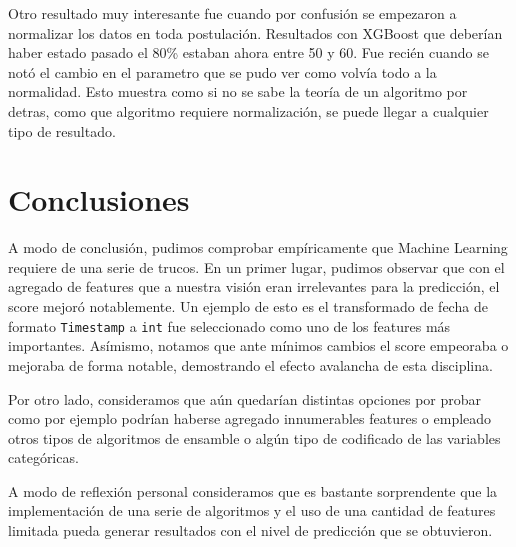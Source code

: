 \documentclass[a4paper]{article}
\begin{document}
Otro resultado muy interesante fue cuando por confusión se empezaron a normalizar los datos en toda postulación. Resultados con XGBoost que deberían haber estado pasado el 80\% estaban ahora entre 50 y 60. Fue recién cuando se notó el cambio en el parametro que se pudo ver como volvía todo a la normalidad. Esto muestra como si no se sabe la teoría de un algoritmo por detras, como que algoritmo requiere normalización, se puede llegar a cualquier tipo de resultado.

\section{Conclusiones}

A modo de conclusión, pudimos comprobar empíricamente que Machine Learning requiere de una serie de trucos. En un primer lugar, pudimos observar que con el agregado de features que a nuestra visión eran irrelevantes para la predicción, el score mejoró notablemente. Un ejemplo de esto es el transformado de fecha de formato \texttt{Timestamp} a \texttt{int} fue seleccionado como uno de los features más importantes. Asímismo, notamos que ante mínimos cambios el score empeoraba o mejoraba de forma notable, demostrando el efecto avalancha de esta disciplina.

Por otro lado, consideramos que aún quedarían distintas opciones por probar como por ejemplo podrían haberse agregado innumerables features o empleado otros tipos de algoritmos de ensamble o algún tipo de codificado de las variables categóricas.

A modo de reflexión personal consideramos que es bastante sorprendente que la implementación de una serie de algoritmos y el uso de una cantidad de features limitada pueda generar resultados con el nivel de predicción que se obtuvieron.
\end{document}
